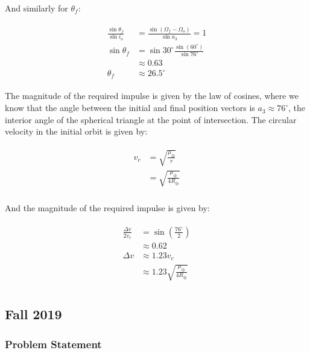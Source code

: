 \documentclass[
]{article}
\begin{document}
And similarly for \(\theta_f\):

\[\begin{aligned}
\begin{aligned}
    \frac{\sin\theta_f}{\sin i_o} &= \frac{\sin(\Omega_f - \Omega_o)}{\sin a_3} = 1 \\
    \sin\theta_f &= \sin 30^\circ \frac{\sin(60^\circ)}{\sin 76^\circ} \\
    &\approx 0.63 \\
    \theta_f &\approx 26.5^\circ
\end{aligned}
\end{aligned}\]

The magnitude of the required impulse is given by the law of cosines,
where we know that the angle between the initial and final position
vectors is \(a_3 \approx 76^\circ\), the interior angle of the spherical
triangle at the point of intersection. The circular velocity in the
initial orbit is given by:

\[\begin{aligned}
\begin{aligned}
    v_c &= \sqrt{\frac{\mu_\oplus}{r}} \\
    &= \sqrt{\frac{\mu_\oplus}{4R_\oplus}} \\
\end{aligned}
\end{aligned}\]

And the magnitude of the required impulse is given by:

\[\begin{aligned}
\begin{aligned}
    \frac{\Delta v}{2 v_c} &= \sin\left( \frac{76^\circ}{2} \right) \\
    &\approx 0.62 \\
    \Delta v &\approx 1.23 v_c \\
    &\approx 1.23 \sqrt{\frac{\mu_\oplus}{4R_\oplus}} \\
\end{aligned}
\end{aligned}\]

\subsection{Fall 2019}\label{fall-2019}

\subsubsection{Problem Statement}\label{problem-statement-3}
\end{document}
